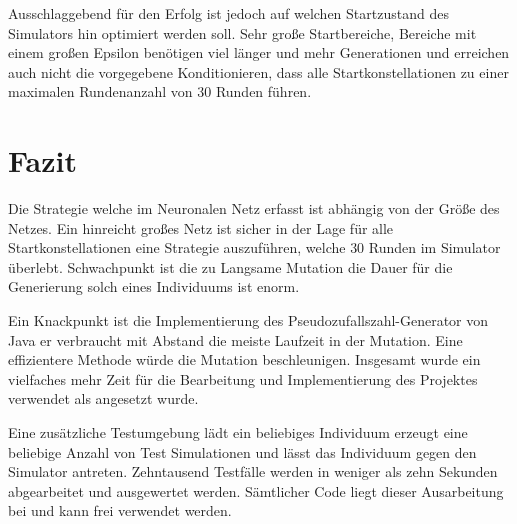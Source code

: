 Ausschlaggebend für den Erfolg ist jedoch auf welchen Startzustand des Simulators hin optimiert werden soll. Sehr große Startbereiche, Bereiche mit einem großen Epsilon benötigen viel länger und mehr Generationen und erreichen auch nicht die vorgegebene Konditionieren, dass alle Startkonstellationen zu einer maximalen Rundenanzahl von $30$ Runden führen.

\section{Fazit}
Die Strategie welche im Neuronalen Netz erfasst ist abhängig von der Größe des Netzes. Ein hinreicht großes Netz ist sicher in der Lage für alle Startkonstellationen eine Strategie auszuführen, welche $30$ Runden im Simulator überlebt. Schwachpunkt ist die zu Langsame Mutation die Dauer für die Generierung solch eines Individuums ist enorm.

Ein Knackpunkt ist die Implementierung des Pseudozufallszahl-Generator von Java er verbraucht mit Abstand die meiste Laufzeit in der Mutation. Eine effizientere Methode würde die Mutation beschleunigen. Insgesamt wurde ein vielfaches mehr Zeit für die Bearbeitung und Implementierung des Projektes verwendet als angesetzt wurde.

Eine zusätzliche Testumgebung lädt ein beliebiges Individuum erzeugt eine beliebige Anzahl von Test Simulationen und lässt das Individuum gegen den Simulator antreten. Zehntausend Testfälle werden in weniger als zehn Sekunden abgearbeitet und ausgewertet werden. Sämtlicher Code liegt dieser Ausarbeitung bei und kann frei verwendet werden.